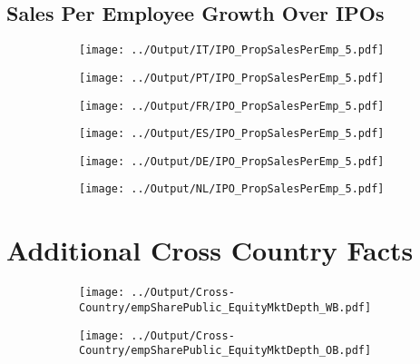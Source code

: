 \documentclass[12pt,notitlepage]{article}
\begin{document}
\subsection{Sales Per Employee Growth Over IPOs}
\FloatBarrier
\begin{figure}[!htpb]
\centering
\begin{subfigure}{.49\textwidth}
    \centering
 \texttt{[image: ../Output/IT/IPO\_PropSalesPerEmp\_5.pdf]}
\end{subfigure}%
\begin{subfigure}{.49\textwidth}
    \centering
 \texttt{[image: ../Output/PT/IPO\_PropSalesPerEmp\_5.pdf]}
\end{subfigure}
\begin{subfigure}{.49\textwidth}
    \centering
 \texttt{[image: ../Output/FR/IPO\_PropSalesPerEmp\_5.pdf]}
\end{subfigure}%
\begin{subfigure}{.49\textwidth}
    \centering
 \texttt{[image: ../Output/ES/IPO\_PropSalesPerEmp\_5.pdf]}
\end{subfigure}
\begin{subfigure}{.49\textwidth}
    \centering
 \texttt{[image: ../Output/DE/IPO\_PropSalesPerEmp\_5.pdf]}
\end{subfigure}
\begin{subfigure}{.49\textwidth}
    \centering
 \texttt{[image: ../Output/NL/IPO\_PropSalesPerEmp\_5.pdf]}
\end{subfigure}
\end{figure}






\appendix

\section{Additional Cross Country Facts} %
\label{sec:additional_cross_country_facts}

\begin{figure}[!htpb]
\centering
\caption{Share of Employment in Public Firms}
\begin{subfigure}{.49\textwidth}
    \centering
 \texttt{[image: ../Output/Cross-Country/empSharePublic\_EquityMktDepth\_WB.pdf]}
\end{subfigure}
\begin{subfigure}{.49\textwidth}
    \centering
  \texttt{[image: ../Output/Cross-Country/empSharePublic\_EquityMktDepth\_OB.pdf]}
\end{subfigure}
\end{figure}
\FloatBarrier
\end{document}
